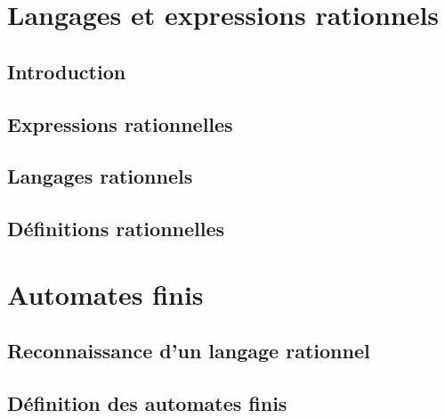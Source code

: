  
\section{Langages et expressions rationnels}
 
\subsection{Introduction}



 
\subsection{Expressions rationnelles}



 
\subsection{Langages rationnels}




 
\subsection{Définitions rationnelles}


 
\section{Automates finis}
 
\subsection{Reconnaissance d'un langage rationnel}




 
\subsection{Définition des automates finis}






